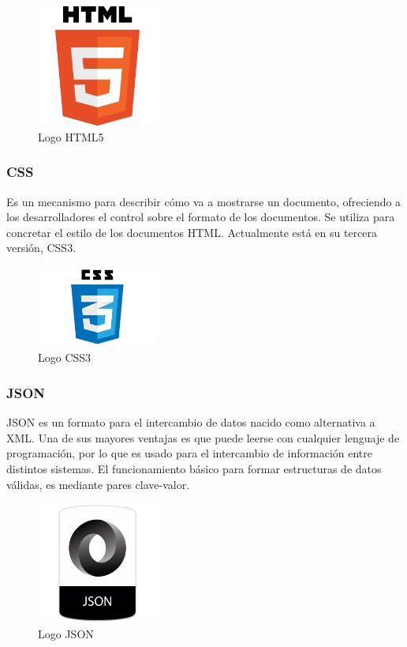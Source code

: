 		\begin{figure}[H]
		\centering
		\includegraphics[width=40mm, fbox={\fboxrule} 4mm]{images/04-metodo/26-html_logo.png}
		\caption{Logo HTML5}
		\label{fig:html5-logo}
		\end{figure}
		
		\subsubsection{\ac{CSS}}
		Es un mecanismo para describir cómo va a mostrarse un documento, ofreciendo a los desarrolladores el control sobre el formato de los documentos. Se utiliza para concretar el estilo de los documentos \ac{HTML}. Actualmente está en su tercera versión, \ac{CSS}3.

		\begin{figure}[H]
		\centering
		\includegraphics[width=40mm, fbox={\fboxrule} 4mm]{images/04-metodo/27-css3_logo.png}
		\caption{Logo CSS3}
		\label{fig:css3-logo}
		\end{figure}	
		
		\subsubsection{\ac{JSON}}
		\ac{JSON} es un formato para el intercambio de datos nacido como alternativa a \ac{XML}. Una de sus mayores ventajas es que puede leerse con cualquier lenguaje de programación, por lo que es usado para el intercambio de información entre distintos sistemas. El funcionamiento básico para formar estructuras de datos válidas, es mediante pares clave-valor.
		
		\begin{figure}[H]
		\centering
		\includegraphics[width=40mm, fbox={\fboxrule} 4mm]{images/04-metodo/28-json_logo.png}
		\caption{Logo JSON}
		\label{fig:json-logo}
		\end{figure}	
		
